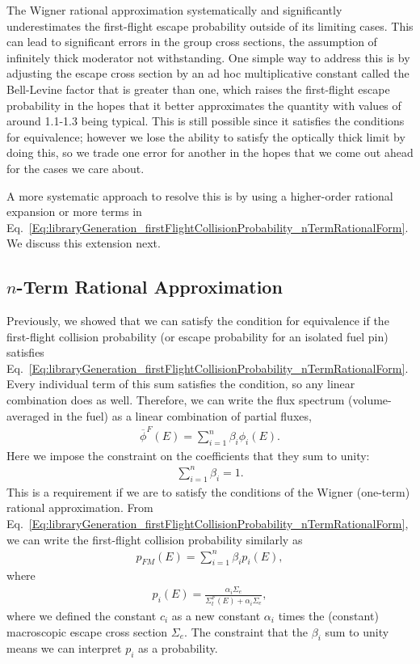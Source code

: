 The Wigner rational approximation systematically and significantly underestimates the first-flight escape probability outside of its limiting cases. This can lead to significant errors in the group cross sections, the assumption of infinitely thick moderator not withstanding. One simple way to address this is by adjusting the escape cross section by an ad hoc multiplicative constant called the Bell-Levine factor that is greater than one, which raises the first-flight escape probability in the hopes that it better approximates the quantity with values of around 1.1-1.3 being typical. This is still possible since it satisfies the conditions for equivalence; however we lose the ability to satisfy the optically thick limit by doing this, so we trade one error for another in the hopes that we come out ahead for the cases we care about. 

A more systematic approach to resolve this is by using a higher-order rational expansion or more terms in Eq.~\eqref{Eq:libraryGeneration_firstFlightCollisionProbability_nTermRationalForm}. We discuss this extension next.




\subsection{$n$-Term Rational Approximation}

Previously, we showed that we can satisfy the condition for equivalence if the first-flight collision probability (or escape probability for an isolated fuel pin) satisfies Eq.~\eqref{Eq:libraryGeneration_firstFlightCollisionProbability_nTermRationalForm}. Every individual term of this sum satisfies the condition, so any linear combination does as well. Therefore, we can write the flux spectrum (volume-averaged in the fuel) as a linear combination of partial fluxes,
\begin{align}
  \overline{\phi}^F(E) = \sum_{i=1}^n \beta_i \phi_i(E) .
\end{align}
Here we impose the constraint on the coefficients that they sum to unity:
\begin{align}
  \sum_{i=1}^n \beta_i = 1.
\end{align}
This is a requirement if we are to satisfy the conditions of the Wigner (one-term) rational approximation. From Eq.~\eqref{Eq:libraryGeneration_firstFlightCollisionProbability_nTermRationalForm}, we can write the first-flight collision probability similarly as
\begin{align}
  p_{FM}(E) = \sum_{i=1}^n \beta_i p_i(E) ,
\end{align}
where
\begin{align}
  p_i(E) = \frac{ \alpha_i \Sigma_e }{ \Sigma_t^F(E) + \alpha_i \Sigma_e } ,
\end{align}
where we defined the constant $c_i$ as a new constant $\alpha_i$ times the (constant) macroscopic escape cross section $\Sigma_e$. The constraint that the $\beta_i$ sum to unity means we can interpret $p_i$ as a probability.

